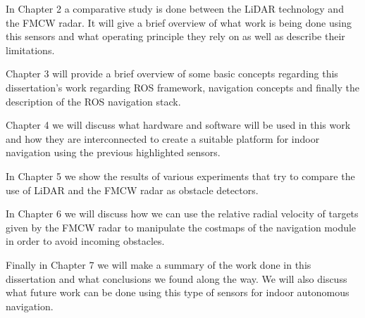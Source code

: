 In Chapter 2 a comparative study is done between the \ac{LiDAR} technology and the \ac{FMCW} \ac{radar}. It will give a brief overview of what work is being done using this sensors and what operating principle they rely on as well as describe their limitations.

Chapter 3 will provide a brief overview of some basic concepts regarding this dissertation's work regarding \ac{ROS} framework, navigation concepts and finally the description of the \ac{ROS} navigation stack.

Chapter 4 we will discuss what hardware and software will be used in this work and how they are interconnected to create a suitable platform for indoor navigation using the previous highlighted sensors.

In Chapter 5 we show the results of various experiments that try to compare the use of \ac{LiDAR} and the \ac{FMCW} \ac{radar} as obstacle detectors.

In Chapter 6 we will discuss how we can use the relative radial velocity of targets given by the \ac{FMCW} \ac{radar} to manipulate the costmaps of the navigation module in order to avoid incoming obstacles.

Finally in Chapter 7 we will make a summary of the work done in this dissertation and what conclusions we found along the way. We will also discuss what future work can be done using this type of sensors for indoor autonomous navigation.



